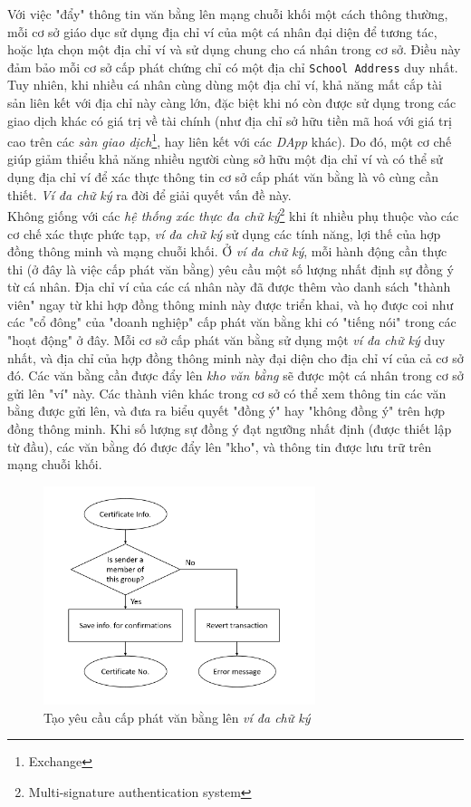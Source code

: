 Với việc "đẩy" thông tin văn bằng lên mạng chuỗi khối một cách thông thường, mỗi cơ sở giáo dục sử dụng địa chỉ ví của một cá nhân đại diện để tương tác, hoặc lựa chọn một địa chỉ ví và sử dụng chung cho cá nhân trong cơ sở. Điều này đảm bảo mỗi cơ sở cấp phát chứng chỉ có một địa chỉ \texttt{School Address} duy nhất. Tuy nhiên, khi nhiều cá nhân cùng dùng một địa chỉ ví, khả năng mất cắp tài sản liên kết với địa chỉ này càng lớn, đặc biệt khi nó còn được sử dụng trong các giao dịch khác có giá trị về tài chính (như địa chỉ sở hữu tiền mã hoá với giá trị cao trên các \textit{sàn giao dịch}\footnote{Exchange}, hay liên kết với các \textit{DApp} khác). Do đó, một cơ chế giúp giảm thiểu khả năng nhiều người cùng sở hữu một địa chỉ ví và có thể sử dụng địa chỉ ví để xác thực thông tin cơ sở cấp phát văn bằng là vô cùng cần thiết. \textit{Ví đa chữ ký} ra đời để giải quyết vấn đề này.\\

Không giống với các \textit{hệ thống xác thực đa chữ ký}\footnote{Multi-signature authentication system} khi ít nhiều phụ thuộc vào các cơ chế xác thực phức tạp, \textit{ví đa chữ ký} sử dụng các tính năng, lợi thế của hợp đồng thông minh và mạng chuỗi khối. Ở \textit{ví đa chữ ký}, mỗi hành động cần thực thi (ở đây là việc cấp phát văn bằng) yêu cầu một số lượng nhất định sự đồng ý từ cá nhân. Địa chỉ ví của các cá nhân này đã được thêm vào danh sách "thành viên" ngay từ khi hợp đồng thông minh này được triển khai, và họ được coi như các "cổ đông" của "doanh nghiệp" cấp phát văn bằng khi có "tiếng nói" trong các "hoạt động" ở đây. Mỗi cơ sở cấp phát văn bằng sử dụng một \textit{ví đa chữ ký} duy nhất, và địa chỉ của hợp đồng thông minh này đại diện cho địa chỉ ví của cả cơ sở đó. Các văn bằng cần được đẩy lên \textit{kho văn bằng} sẽ được một cá nhân trong cơ sở gửi lên "ví" này. Các thành viên khác trong cơ sở có thể xem thông tin các văn bằng được gửi lên, và đưa ra biểu quyết "đồng ý" hay "không đồng ý" trên hợp đồng thông minh. Khi số lượng sự đồng ý đạt ngưỡng nhất định (được thiết lập từ đầu), các văn bằng đó được đẩy lên "kho", và thông tin được lưu trữ trên mạng chuỗi khối.\\

\begin{figure}[!ht]
    \centering
    \includegraphics[width=300px]{anh/giai-phap/multisig-add-cert.png}
    \caption{Tạo yêu cầu cấp phát văn bằng lên \textit{ví đa chữ ký}}
\end{figure}

